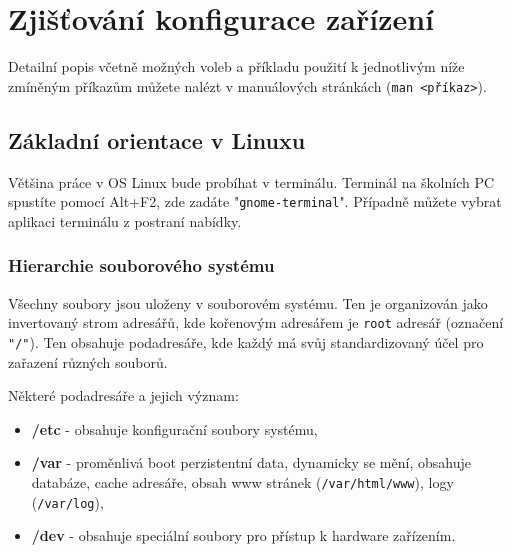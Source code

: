 
\section{Zjišťování konfigurace zařízení}
Detailní popis včetně možných voleb a příkladu použití k jednotlivým níže zmíněným příkazům můžete nalézt v manuálových stránkách (\texttt{man <příkaz>}).
\subsection{Základní orientace v Linuxu}
Většina práce v OS Linux bude probíhat v terminálu. Terminál na školních PC spustíte pomocí Alt+F2, zde zadáte "\texttt{gnome-terminal}". Případně můžete vybrat aplikaci terminálu z postraní nabídky.
\subsubsection{Hierarchie souborového systému}
Všechny soubory jsou uloženy v souborovém systému. Ten je organizován jako invertovaný strom adresářů,
kde kořenovým adresářem je \texttt{root} adresář (označení \texttt{"/"}). Ten obsahuje podadresáře,
kde každý má svůj standardizovaný účel pro zařazení různých souborů.

Některé podadresáře a jejich význam:
\begin{itemize}
				\item \textbf{/etc} - obsahuje konfigurační soubory systému,
				\item \textbf{/var} - proměnlivá boot perzistentní data, dynamicky se mění, obsahuje databáze, cache adresáře, obsah www stránek (\texttt{/var/html/www}), logy (\texttt{/var/log}),
				\item \textbf{/dev} - obsahuje speciální soubory pro přístup k hardware zařízením.
\end{itemize}

